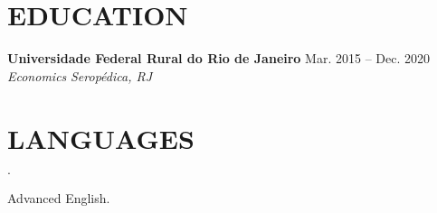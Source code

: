 \documentclass[12pt]{article}
\newenvironment{tightlist}
  {\begin{list}
    {$\cdot$}
    {
      \setlength{\leftmargin}{0em}
      \setlength{\itemsep}{\smallskipamount}
    }
  }
{\end{list}}
\begin{document}
\section*{EDUCATION}

\textbf{Universidade Federal Rural do Rio de Janeiro} \hfill {Mar. 2015 -- Dec. 2020} \\
\textit{Economics} \hfill \textit{Seropédica, RJ} {\parfillskip=0pt\par}

\section*{LANGUAGES}

\begin{tightlist}
  \item Advanced English.
\end{tightlist}
\end{document}
